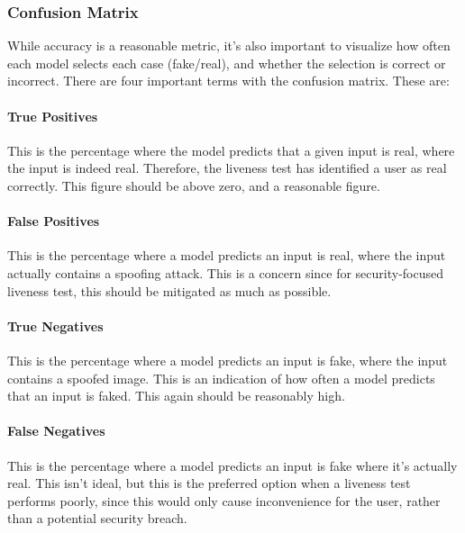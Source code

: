 \documentclass[12pt,a4paper]{article}
\begin{document}
        \subsubsection{Confusion Matrix}
            While accuracy is a reasonable metric, it's also important to visualize how often each model selects each case (fake/real), and whether the selection is correct or incorrect.
            There are four important terms with the confusion matrix. These are:
            \begin{multicols}{2}

            \paragraph{True Positives}
                This is the percentage where the model predicts that a given input is real, where the input is indeed real. Therefore, the liveness test has identified a user as real correctly.
                This figure should be above zero, and a reasonable figure. 

            \paragraph{False Positives}
                This is the percentage where a model predicts an input is real, where the input actually contains a spoofing attack. This is a concern since for security-focused
                liveness test, this should be mitigated as much as possible.

            \paragraph{True Negatives}
                This is the percentage where a model predicts an input is fake, where the input contains a spoofed image. This is an indication of how often a model predicts that an input is faked.
                This again should be reasonably high.

            \paragraph{False Negatives}
                This is the percentage where a model predicts an input is fake where it's actually real. This isn't ideal, but this is the preferred option when a liveness test performs poorly, since
                this would only cause inconvenience for the user, rather than a potential security breach.
            \end{multicols}
   
\end{document}

